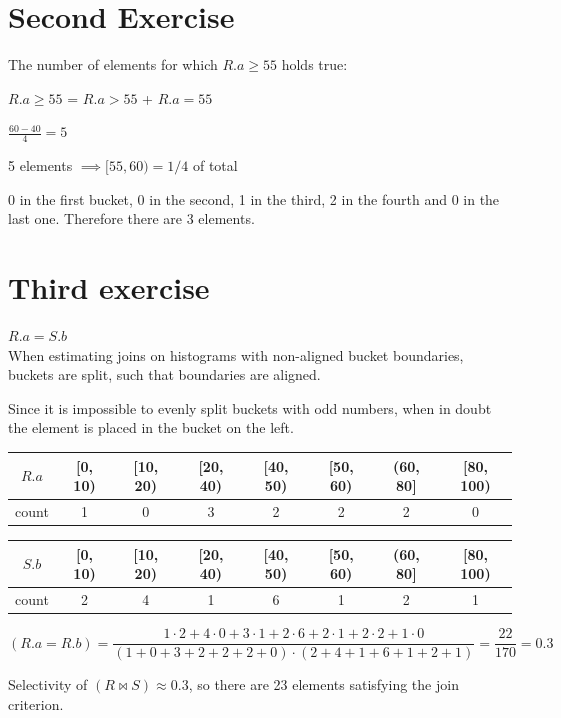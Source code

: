 \documentclass[12pt]{article}
\begin{document}
	\section{Second Exercise}
	
	The number of elements for which $R.a \geq 55$ holds true:
	
	$R.a \geq 55$ = $R.a > 55$ + $R.a = 55$
	
	$\frac{60-40}{4} = 5$
	
	5 elements $\implies [55, 60) = 1/4$ of total
	
	0 in the first bucket, 0 in the second, 1 in the third, 2 in the fourth and 0 in the last one. Therefore there are 3 elements.
	
	\section{Third exercise}
	$R.a = S.b$ \\
	When estimating joins on histograms with non-aligned bucket boundaries, buckets are split, such that boundaries are aligned.
	
	Since it is impossible to evenly split buckets with odd numbers, when in doubt the element is placed in the bucket on the left.
	
	\begin{tabular}{c|c|c|c|c|c|c|c}
	     $R.a$ & [0, 10) & [10, 20) & [20, 40) & [40, 50) & [50, 60) & (60, 80] & [80, 100) \\
	     \hline
	     count & 1 & 0 & 3 & 2 & 2 & 2 & 0 \\
	\end{tabular}
	
	\begin{tabular}{c|c|c|c|c|c|c|c}
		$S.b$ & [0, 10) & [10, 20) & [20, 40) & [40, 50) & [50, 60) & (60, 80] & [80, 100) \\
		\hline
		count & 2 & 4 & 1 & 6 & 1 & 2 & 1 \\
	\end{tabular}
	
	$$(R.a = R.b) = \frac{1 \cdot 2 + 4 \cdot 0 + 3 \cdot 1 + 2 \cdot 6 + 2 \cdot 1 + 2 \cdot 2 + 1 \cdot 0}{(1+0+3+2+2+2+0) \cdot (2+4+1+6+1+2+1)} = \frac{22}{170} = 0.3$$
	
	Selectivity of $(R \Join S) \approx 0.3$, so there are 23 elements satisfying the join criterion.
\end{document}
